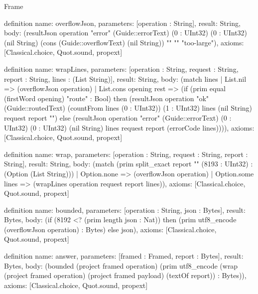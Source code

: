 \begin{lexlean}{Frame}
\begin{semanticmodule}
definition{
  name: overflowJson,
  parameters: [operation : String],
  result: String,
  body: (resultJson operation "error" (Guide::errorText) (0 : UInt32) (0 : UInt32) (nil String) (cons (Guide::overflowText) (nil String)) "" "" "too-large"),
  axioms: [Classical.choice, Quot.sound, propext]
}

definition{
  name: wrapLines,
  parameters: [operation : String, request : String, report : String, lines : (List String)],
  result: String,
  body: (match lines
    | List.nil => (overflowJson operation)
    | List.cons opening rest => (if (prim equal (firstWord opening) "route" : Bool) then (resultJson operation "ok" (Guide::routedText) (countFrom lines (0 : UInt32)) (1 : UInt32) lines (nil String) request report "") else (resultJson operation "error" (Guide::errorText) (0 : UInt32) (0 : UInt32) (nil String) lines request report (errorCode lines)))),
  axioms: [Classical.choice, Quot.sound, propext]
}

definition{
  name: wrap,
  parameters: [operation : String, request : String, report : String],
  result: String,
  body: (match (prim split_exact report "\n" (8193 : UInt32) : (Option (List String)))
    | Option.none => (overflowJson operation)
    | Option.some lines => (wrapLines operation request report lines)),
  axioms: [Classical.choice, Quot.sound, propext]
}

definition{
  name: bounded,
  parameters: [operation : String, json : Bytes],
  result: Bytes,
  body: (if (8192 <? (prim length json : Nat)) then (prim utf8_encode (overflowJson operation) : Bytes) else json),
  axioms: [Classical.choice, Quot.sound, propext]
}

definition{
  name: answer,
  parameters: [framed : Framed, report : Bytes],
  result: Bytes,
  body: (bounded (project framed operation) (prim utf8_encode (wrap (project framed operation) (project framed payload) (textOf report)) : Bytes)),
  axioms: [Classical.choice, Quot.sound, propext]
}
\end{semanticmodule}
\end{lexlean}
